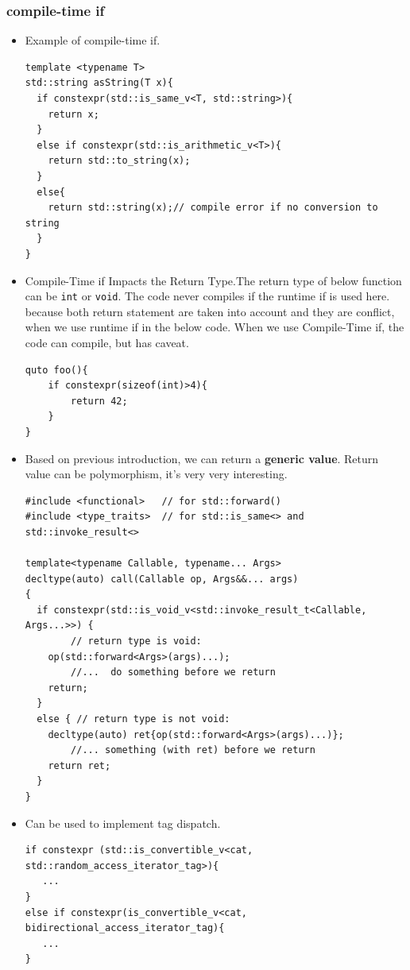 \documentclass[a4paper,11pt,twoside]{book}
\begin{document}
\subsubsection{compile-time if}
\begin{itemize}
		\item Example of compile-time if.
\begin{lstlisting}
template <typename T>
std::string asString(T x){
  if constexpr(std::is_same_v<T, std::string>){
    return x;
  }
  else if constexpr(std::is_arithmetic_v<T>){
    return std::to_string(x);
  }
  else{
    return std::string(x);// compile error if no conversion to string
  }
}
\end{lstlisting}

	\item Compile-Time if Impacts the Return Type.The return type of below function can be \texttt{int} or \texttt{void}. The code never compiles if the runtime if is used here. because both return statement are taken into account and they are conflict, when we use runtime if in the below code. When we use Compile-Time if, the code can compile, but has caveat. 
\begin{lstlisting}
quto foo(){
	if constexpr(sizeof(int)>4){
		return 42;
	}
}	
\end{lstlisting}

		\item Based on previous introduction, we can return a \textbf{generic value}. Return value can be polymorphism, it's very very interesting. 
\begin{lstlisting}
#include <functional>   // for std::forward()
#include <type_traits>  // for std::is_same<> and std::invoke_result<>

template<typename Callable, typename... Args>
decltype(auto) call(Callable op, Args&&... args)
{
  if constexpr(std::is_void_v<std::invoke_result_t<Callable, Args...>>) {
    	// return type is void:
    op(std::forward<Args>(args)...);
    	//...  do something before we return
    return;
  }
  else { // return type is not void:
    decltype(auto) ret{op(std::forward<Args>(args)...)};
    	//... something (with ret) before we return
    return ret;
  }
}
\end{lstlisting}

    \item Can be used to implement tag dispatch.

\begin{lstlisting}
if constexpr (std::is_convertible_v<cat, std::random_access_iterator_tag>){
   ...
}
else if constexpr(is_convertible_v<cat, bidirectional_access_iterator_tag){
   ...
}
\end{lstlisting}

\end{itemize}
\end{document}
